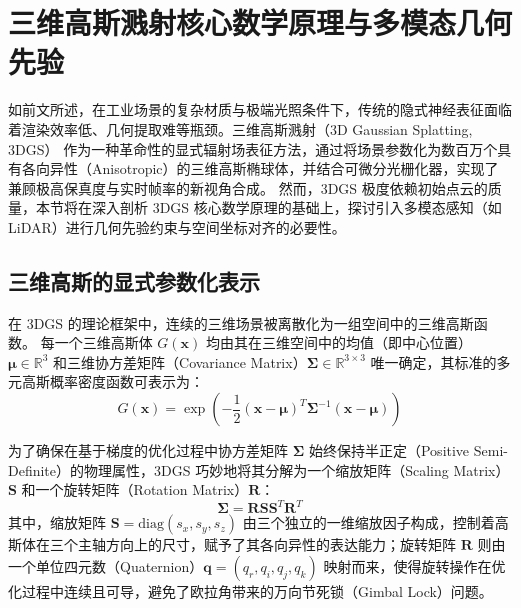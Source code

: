 
\section{三维高斯溅射核心数学原理与多模态几何先验}
\label{sec:3dgs_core_principles}

如前文所述，在工业场景的复杂材质与极端光照条件下，传统的隐式神经表征面临着渲染效率低、几何提取难等瓶颈。三维高斯溅射（3D Gaussian Splatting, 3DGS）\cite{kerbl20233d} 作为一种革命性的显式辐射场表征方法，通过将场景参数化为数百万个具有各向异性（Anisotropic）的三维高斯椭球体，并结合可微分光栅化器，实现了兼顾极高保真度与实时帧率的新视角合成。
然而，3DGS 极度依赖初始点云的质量，本节将在深入剖析 3DGS 核心数学原理的基础上，探讨引入多模态感知（如 LiDAR）进行几何先验约束与空间坐标对齐的必要性。

\subsection{三维高斯的显式参数化表示}
\label{subsec:gaussian_representation}

在 3DGS 的理论框架中，连续的三维场景被离散化为一组空间中的三维高斯函数。
每一个三维高斯体 $G(\bm{x})$ 均由其在三维空间中的均值（即中心位置）$\bm{\mu} \in \mathbb{R}^3$ 和三维协方差矩阵（Covariance Matrix）$\bm{\Sigma} \in \mathbb{R}^{3 \times 3}$ 唯一确定，其标准的多元高斯概率密度函数可表示为：
\begin{equation}
    G(\bm{x}) = \exp \left( -\frac{1}{2} (\bm{x} - \bm{\mu})^T \bm{\Sigma}^{-1} (\bm{x} - \bm{\mu}) \right)
\end{equation}

为了确保在基于梯度的优化过程中协方差矩阵 $\bm{\Sigma}$ 始终保持半正定（Positive Semi-Definite）的物理属性，3DGS 巧妙地将其分解为一个缩放矩阵（Scaling Matrix）$\bm{S}$ 和一个旋转矩阵（Rotation Matrix）$\bm{R}$：
\begin{equation}
    \bm{\Sigma} = \bm{R} \bm{S} \bm{S}^T \bm{R}^T
\end{equation}
其中，缩放矩阵 $\bm{S} = \text{diag}(s_x, s_y, s_z)$ 由三个独立的一维缩放因子构成，控制着高斯体在三个主轴方向上的尺寸，赋予了其各向异性的表达能力；旋转矩阵 $\bm{R}$ 则由一个单位四元数（Quaternion）$\bm{q} = (q_r, q_i, q_j, q_k)$ 映射而来，使得旋转操作在优化过程中连续且可导，避免了欧拉角带来的万向节死锁（Gimbal Lock）问题。

